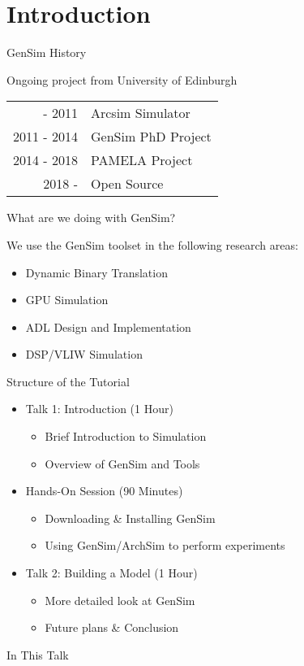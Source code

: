
\section{Introduction}

\begin{frame}{GenSim History}


\centering
Ongoing project from University of Edinburgh

\smallskip

\begin{tabular}{r l}
\phantom{0000} - 2011 & Arcsim Simulator \\
2011 - 2014 & GenSim PhD Project \\
2014 - 2018 & PAMELA Project \\
2018 - \phantom{0000}        & Open Source
\end{tabular}

\end{frame}

\begin{frame}{What are we doing with GenSim?}

We use the GenSim toolset in the following research areas:

\begin{itemize}
\item Dynamic Binary Translation
\item GPU Simulation
\item ADL Design and Implementation
\item DSP/VLIW Simulation
\end{itemize}

\end{frame}

\begin{frame}{Structure of the Tutorial}

\begin{itemize}
\item Talk 1: Introduction (1 Hour)
\begin{itemize}
	\item Brief Introduction to Simulation
	\item Overview of GenSim and Tools
\end{itemize}

\item Hands-On Session (90 Minutes)
\begin{itemize}
	\item Downloading \& Installing GenSim
	\item Using GenSim/ArchSim to perform experiments
\end{itemize}

\item Talk 2: Building a Model (1 Hour)
\begin{itemize}
	\item More detailed look at GenSim
	\item Future plans \& Conclusion
\end{itemize}

\end{itemize}

\end{frame}

\begin{frame}{In This Talk}
	\tableofcontents
\end{frame}	
